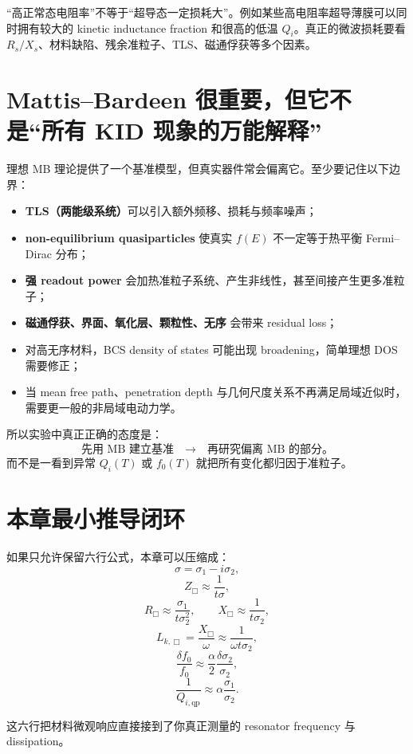 \documentclass[11pt,a4paper,openany]{ctexrep}
\newcommand{\qp}{\mathrm{qp}}
\begin{document}
\begin{mistakebox}
“高正常态电阻率”不等于“超导态一定损耗大”。例如某些高电阻率超导薄膜可以同时拥有较大的 kinetic inductance fraction 和很高的低温 $Q_i$。真正的微波损耗要看 $R_s/X_s$、材料缺陷、残余准粒子、TLS、磁通俘获等多个因素。
\end{mistakebox}

\section{Mattis--Bardeen 很重要，但它不是“所有 KID 现象的万能解释”}

理想 MB 理论提供了一个基准模型，但真实器件常会偏离它。至少要记住以下边界：
\begin{itemize}
  \item \textbf{TLS（两能级系统）}可以引入额外频移、损耗与频率噪声；
  \item \textbf{non-equilibrium quasiparticles} 使真实 $f(E)$ 不一定等于热平衡 Fermi--Dirac 分布；
  \item \textbf{强 readout power} 会加热准粒子系统、产生非线性，甚至间接产生更多准粒子；
  \item \textbf{磁通俘获、界面、氧化层、颗粒性、无序} 会带来 residual loss；
  \item 对高无序材料，BCS density of states 可能出现 broadening，简单理想 DOS 需要修正；
  \item 当 mean free path、penetration depth 与几何尺度关系不再满足局域近似时，需要更一般的非局域电动力学。
\end{itemize}

所以实验中真正正确的态度是：
\[
\boxed{
\text{先用 MB 建立基准}
\quad\rightarrow\quad
\text{再研究偏离 MB 的部分。}
}
\]
而不是一看到异常 $Q_i(T)$ 或 $f_0(T)$ 就把所有变化都归因于准粒子。

\section{本章最小推导闭环}

如果只允许保留六行公式，本章可以压缩成：
\[
\sigma=\sigma_1-i\sigma_2,
\]
\[
Z_{\Box}\approx\frac{1}{t\sigma},
\]
\[
R_{\Box}\approx\frac{\sigma_1}{t\sigma_2^2},
\qquad
X_{\Box}\approx\frac{1}{t\sigma_2},
\]
\[
L_{k,\Box}=\frac{X_{\Box}}{\omega}
\approx\frac{1}{\omega t\sigma_2},
\]
\[
\frac{\delta f_0}{f_0}
\approx
\frac{\alpha}{2}\frac{\delta\sigma_2}{\sigma_2},
\]
\[
\frac{1}{Q_{i,\qp}}
\approx
\alpha\frac{\sigma_1}{\sigma_2}.
\]

这六行把材料微观响应直接接到了你真正测量的 resonator frequency 与 dissipation。
\end{document}
